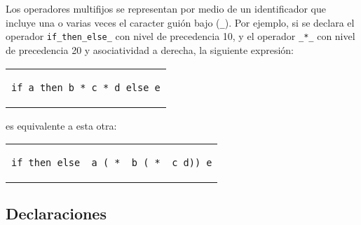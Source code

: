Los operadores multifijos se representan por medio de un identificador
que incluye una o varias veces el caracter guión bajo (\verb|_|).
Por ejemplo, si
se declara el operador \verb|if_then_else_| con nivel de precedencia 10,
y el operador \verb|_*_| con nivel de precedencia 20 y asociatividad
a derecha, la siguiente expresión:
\begin{center}
\begin{tabular}{l}
\begin{lstlisting}
if a then b * c * d else e
\end{lstlisting}
\end{tabular}
\end{center}
es equivalente a esta otra:
\begin{center}
\begin{tabular}{l}
\begin{lstlisting}
if_then_else_ a (_*_ b (_*_ c d)) e
\end{lstlisting}
\end{tabular}
\end{center}

\subsection{Declaraciones}

